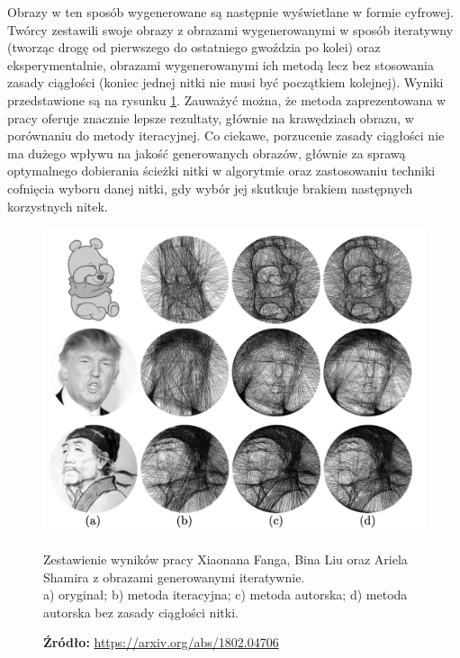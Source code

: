         Obrazy w ten sposób wygenerowane są następnie wyświetlane w formie cyfrowej. Twórcy zestawili swoje obrazy z obrazami wygenerowanymi w sposób iteratywny (tworząc drogę od pierwszego do ostatniego gwoździa po kolei) oraz eksperymentalnie, obrazami wygenerowanymi ich metodą lecz bez stosowania zasady ciągłości (koniec jednej nitki nie musi być początkiem kolejnej). Wyniki przedstawione są na rysunku \ref{przyklad-testowy-xin}. Zauważyć można, że metoda zaprezentowana w pracy oferuje znacznie lepsze rezultaty, głównie na krawędziach obrazu, w porównaniu do metody iteracyjnej. Co ciekawe, porzucenie zasady ciągłości nie ma dużego wpływu na jakość generowanych obrazów, głównie za sprawą optymalnego dobierania ścieżki nitki w algorytmie oraz zastosowaniu techniki cofnięcia wyboru danej nitki, gdy wybór jej skutkuje brakiem następnych korzystnych nitek. 
        \begin{figure}[H]
            \centering
            \includegraphics[width=\textwidth,keepaspectratio]{img/3-others/xin-vs-greedy.png}
            \caption[Zestawienie wyników pracy Xiaonana Fanga, Bina Liu oraz Ariela Shamira z obrazami generowanymi iteratywnie.]{Zestawienie wyników pracy Xiaonana Fanga, Bina Liu oraz Ariela Shamira z obrazami generowanymi iteratywnie. \\ a) oryginał; b) metoda iteracyjna; c) metoda autorska; d) metoda autorska bez zasady ciągłości nitki.}
            \caption*{\footnotesize{\textbf{Źródło:} {\url{https://arxiv.org/abs/1802.04706}}}}
            \label{przyklad-testowy-xin}
        \end{figure}
            
